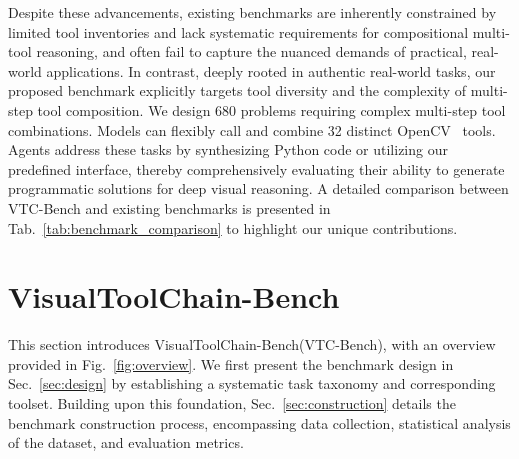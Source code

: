 \documentclass[runningheads]{llncs}
\newcommand{\benchname}{VTC-Bench\xspace}
\begin{document}
Despite these advancements, existing benchmarks are inherently constrained by limited tool inventories and lack systematic requirements for compositional multi-tool reasoning, and often fail to capture the nuanced demands of practical, real-world applications.
In contrast, deeply rooted in authentic real-world tasks, our proposed benchmark explicitly targets tool diversity and the complexity of multi-step tool composition. We design 680 problems requiring complex multi-step tool combinations. Models can flexibly call and combine 32 distinct OpenCV~\cite{itseez2014theopencv} tools. 
Agents address these tasks by synthesizing Python code or utilizing our predefined interface,
thereby comprehensively evaluating their ability to generate programmatic solutions for deep visual reasoning. 
A detailed comparison between \benchname and existing benchmarks is presented in Tab.~\ref{tab:benchmark_comparison} to highlight our unique contributions.

\section{VisualToolChain-Bench}
This section introduces VisualToolChain-Bench(\benchname), with an overview provided in Fig.~\ref{fig:overview}. We first present the benchmark design in Sec.~\ref{sec:design} by establishing a systematic task taxonomy and corresponding toolset. Building upon this foundation, Sec.~\ref{sec:construction} details the benchmark construction process, encompassing data collection, statistical analysis of the dataset, and evaluation metrics.
\end{document}
